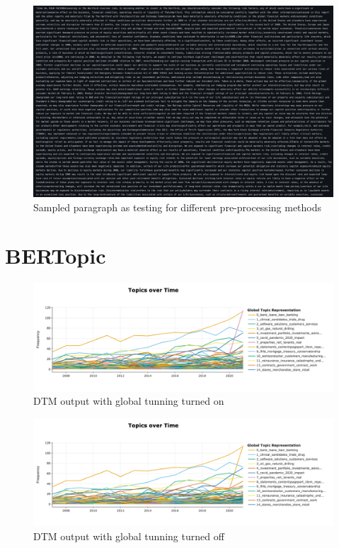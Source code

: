 \documentclass[12pt,MSc,a4paper,oneside]{muthesis}
\begin{document}
    \label{appendix:8}
    \begin{figure}[h]
      \centering
      \includegraphics[scale=0.10]{images/preprocessing-sample.png}
      \caption{Sampled paragraph as testing for different pre-processing methods}
    \end{figure}

    \chapter{BERTopic}

    \label{appendix:9}
    \begin{figure}[h]
      \centering
      \includegraphics[scale=0.35]{TOT_with_global.png}
      \caption{DTM output with global tunning turned on}
    \end{figure}

    \label{appendix:10}
    \begin{figure}[h]
      \centering
      \includegraphics[scale=0.4]{TOT_without_global.png}
      \caption{DTM output with global tunning turned off}
    \end{figure}
\end{document}
